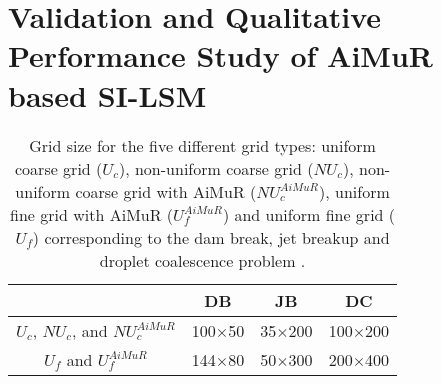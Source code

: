 \documentclass[preprint,12pt]{elsarticle}
\begin{document}
\section{Validation and Qualitative Performance Study of A\lowercase{i}M\lowercase{u}R based SI-LSM }\label{sec:validation}

\begin{table}
\protect\caption{\label{tab:Resolution-of-different}Grid size for the five different grid
types: uniform coarse grid ($U_{c}$), non-uniform coarse grid ($NU_{c}$),
non-uniform coarse grid with AiMuR ($NU_{c}^{AiMuR}$), uniform fine grid with AiMuR ($U_{f}^{AiMuR}$) and uniform fine grid ($U_{f}$)
corresponding to the dam break, jet breakup and droplet coalescence problem . }


\begin{centering}

\par\end{centering}

\centering{}%
\begin{tabular}{cccc}
\hline
 & DB & JB & DC\tabularnewline
\hline
$U_{c}$, $NU_{c}$, and $NU_{c}^{AiMuR}$ & 100$\times$50 & 35$\times$200 & 100$\times$200\tabularnewline
$U_{f}$ and $U_{f}^{AiMuR}$ & 144$\times$80 & 50$\times$300 & 200$\times$400\tabularnewline
\hline
\end{tabular}
\end{table}
\end{document}
